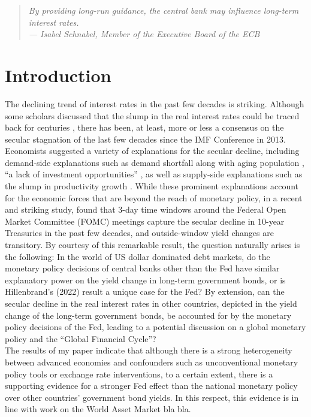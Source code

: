 \begin{quote}
    \itshape
    \setlength{\leftskip}{1cm}
    By providing long-run guidance, the central bank may influence long-term interest rates. \\
    \normalfont
    \hspace*{\fill}--- Isabel Schnabel, Member of the Executive Board of the ECB
\end{quote}

\section{Introduction}

The declining trend of interest rates in the past few decades is striking. Although some scholars discussed that the slump in the real interest rates could be traced back for centuries \citep{rogoff2022}, there has been, at least, more or less a consensus on the secular stagnation of the last few decades since the IMF Conference in 2013. Economists suggested a variety of explanations for the secular decline, including demand-side explanations such as demand shortfall along with aging population \citep{krugman2014four}, ``a lack of investment opportunities'' \citep{summers2014reflections}, as well as supply-side explanations such as the slump in productivity growth \citep{gordon2017rise}. While these prominent explanations account for the economic forces that are beyond the reach of monetary policy, in a recent and striking study, \citet{hillenbrand2022} found that 3-day time windows around the Federal Open Market Committee (FOMC) meetings capture the secular decline in 10-year Treasuries in the past few decades, and outside-window yield changes are transitory. By courtesy of this remarkable result, the question naturally arises is the following: In the world of US dollar dominated debt markets, do the monetary policy decisions of central banks other than the Fed have similar explanatory power on the yield change in long-term government bonds, or is Hillenbrand's (2022) result a unique case for the Fed? By extension, can the secular decline in the real interest rates in other countries, depicted in the yield change of the long-term government bonds, be accounted for by the monetary policy decisions of the Fed, leading to a potential discussion on a global monetary policy and the ``Global Financial Cycle''? \\

The results of my paper indicate that although there is a strong heterogeneity between advanced economies and confounders such as unconventional monetary policy tools or exchange rate interventions, to a certain extent, there is a supporting evidence for a stronger Fed effect than the national monetary policy over other countries' government bond yields. In this respect, this evidence is in line with \citet{miranda2015world} work on the World Asset Market bla bla. \\

